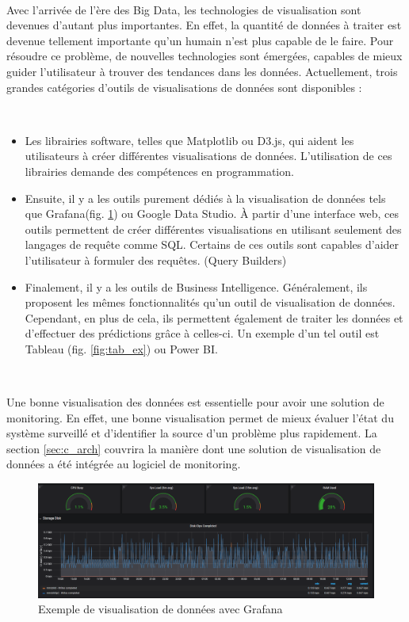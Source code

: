 ~


\noindent
Avec l'arrivée de l'ère des Big Data, les technologies de visualisation sont devenues d'autant plus importantes. En effet, la quantité de données à traiter est devenue tellement importante qu'un humain n'est plus capable de le faire. Pour résoudre ce problème, de nouvelles technologies sont émergées, capables de mieux guider l'utilisateur à trouver des tendances dans les données. Actuellement, trois grandes catégories d'outils de visualisations de données sont disponibles :

~

\begin{itemize}
  \item Les librairies software, telles que Matplotlib ou D3.js, qui aident les utilisateurs à créer différentes visualisations de données. L'utilisation de ces librairies demande des compétences en programmation.

  \item Ensuite, il y a les outils purement dédiés à la visualisation de données tels que Grafana(fig. \ref{fig:graf_ex}) ou Google Data Studio. À partir d'une interface web, ces outils permettent de créer différentes visualisations en utilisant seulement des langages de requête comme SQL. Certains de ces outils sont capables d'aider l'utilisateur à formuler des requêtes. (Query Builders)

  \item Finalement, il y a les outils de Business Intelligence. Généralement, ils proposent les mêmes fonctionnalités qu'un outil de visualisation de données. Cependant, en plus de cela, ils permettent également de traiter les données et d'effectuer des prédictions grâce à celles-ci. Un exemple d'un tel outil est Tableau (fig. \ref{fig:tab_ex}) ou Power BI.
\end{itemize}

~

\noindent
Une bonne visualisation des données est essentielle pour avoir une solution de monitoring. En effet, une bonne visualisation permet de mieux évaluer l'état du système surveillé et d'identifier la source d'un problème plus rapidement. La section \ref{sec:c_arch} couvrira la manière dont une solution de visualisation de données a été intégrée au logiciel de monitoring.


\begin{figure}[ht!]
  \includegraphics[width=\textwidth]{img/state_of_the_art/data_grafana.png}
  \caption{Exemple de visualisation de données avec Grafana}
  \label{fig:graf_ex}
\end{figure}


